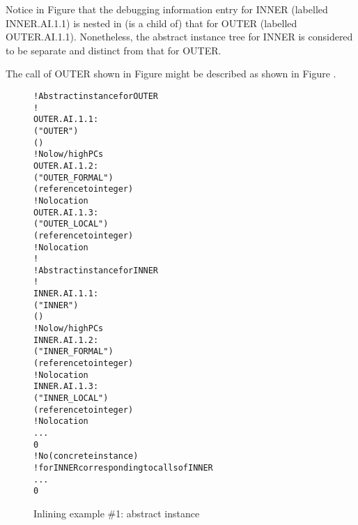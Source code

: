Notice in 
Figure  
that the debugging information entry for
INNER (labelled INNER.AI.1.1) is nested in (is a child of)
that for OUTER (labelled OUTER.AI.1.1). Nonetheless, the
abstract instance tree for INNER is considered to be separate
and distinct from that for OUTER.

The call of OUTER shown in 
Figure 
might be described as
shown in 
Figure .


\begin{figure}[p]
\begin{dwflisting}
\begin{alltt}
    ! Abstract instance for OUTER
    ! 
OUTER.AI.1.1:
        ("OUTER")
        ()
        ! No low/high PCs
OUTER.AI.1.2:
            ("OUTER\_FORMAL")
            (reference to integer)
            ! No location
OUTER.AI.1.3:
            ("OUTER\_LOCAL")
            (reference to integer)
            ! No location
        !
        ! Abstract instance for INNER
        !
INNER.AI.1.1:
            ("INNER")
            ()
            ! No low/high PCs
INNER.AI.1.2:
                ("INNER\_FORMAL")
                (reference to integer)
                ! No location
INNER.AI.1.3:
                ("INNER\_LOCAL")
                (reference to integer)
                ! No location
            ...
            0
        ! No  (concrete instance)
        ! for INNER corresponding to calls of INNER
        ...
        0
\end{alltt}
\end{dwflisting}
\caption{Inlining example \#1: abstract instance}
\label{fig:inliningexample1abstractinstance}
\end{figure}

